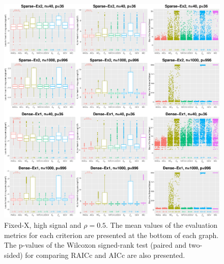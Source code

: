 \begin{figure}[!ht]
  \centering
  \includegraphics[width=\textwidth]{figures/main/fixedx/subset_selection/largep_hsnr.eps}
  \caption{Fixed-X, high signal and $\rho=0.5$. The mean values of the evaluation metrics for each criterion are presented at the bottom of each graph. The p-values of the Wilcoxon signed-rank test (paired and two-sided) for comparing RAICc and AICc are also presented.}
  \label{fig:subsetselection_fixedx_hsnr_largep}
\end{figure}


